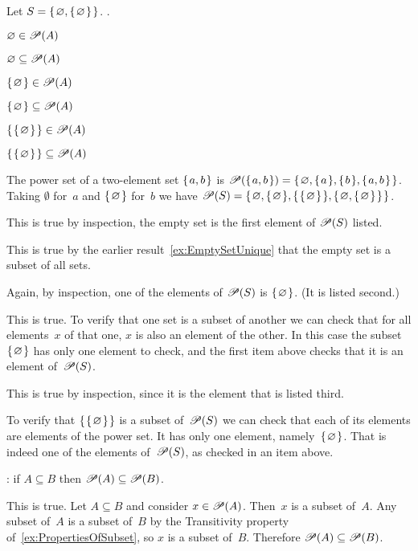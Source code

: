 \documentclass{ibl}
\begin{document}
\begin{ex}  Let $S=\mbox{$\{\hspace{0.1em}\varnothing,\mbox{$\{\hspace{0.1em}\varnothing\hspace{0.1em}\}$}\hspace{0.1em}\}$}$. \pord.
\begin{exes}
\item $\varnothing\in\mathscr{P}(A)$    
\item $\varnothing\subseteq\mathscr{P}(A)$    
\item $\mbox{$\{\hspace{0.1em}\varnothing\hspace{0.1em}\}$}\in\mathscr{P}(A)$    
\item $\mbox{$\{\hspace{0.1em}\varnothing\hspace{0.1em}\}$}\subseteq\mathscr{P}(A)$    
\item $\mbox{$\{\hspace{0.1em}\mbox{$\{\hspace{0.1em}\varnothing\hspace{0.1em}\}$}\hspace{0.1em}\}$}\in\mathscr{P}(A)$    
\item $\mbox{$\{\hspace{0.1em}\mbox{$\{\hspace{0.1em}\varnothing\hspace{0.1em}\}$}\hspace{0.1em}\}$}\subseteq\mathscr{P}(A)$    
\end{exes}
\begin{ans}
The power set of a two-element set $\mbox{$\{\hspace{0.1em}a,b\hspace{0.1em}\}$}$ is 
$\mathscr{P}(\mbox{$\{\hspace{0.1em}a,b\hspace{0.1em}\}$})=\mbox{$\{\hspace{0.1em}\varnothing,\mbox{$\{\hspace{0.1em}a\hspace{0.1em}\}$},\mbox{$\{\hspace{0.1em}b\hspace{0.1em}\}$},\mbox{$\{\hspace{0.1em}a,b\hspace{0.1em}\}$}\hspace{0.1em}\}$}$.
Taking $\emptyset$ for~$a$ and $\mbox{$\{\hspace{0.1em}\varnothing\hspace{0.1em}\}$}$ for~$b$ we have
$\mathscr{P}(S)=\mbox{$\{\hspace{0.1em}\varnothing, \mbox{$\{\hspace{0.1em}\varnothing\hspace{0.1em}\}$}, \mbox{$\{\hspace{0.1em}\mbox{$\{\hspace{0.1em}\varnothing\hspace{0.1em}\}$}\hspace{0.1em}\}$}, 
                   \mbox{$\{\hspace{0.1em}\varnothing, \mbox{$\{\hspace{0.1em}\varnothing\hspace{0.1em}\}$}\hspace{0.1em}\}$}\hspace{0.1em}\}$}$.
\begin{exes}
\item This is true by inspection, the empty set is the first element
  of $\mathscr{P}(S)$ listed.
\item This is true by the earlier result~\ref{ex:EmptySetUnique}
  that the empty set is a subset of all sets.
\item Again, by inspection, one of the elements of $\mathscr{P}(S)$ is 
  $\mbox{$\{\hspace{0.1em}\varnothing\hspace{0.1em}\}$}$.  (It is listed second.)
\item This is true.
  To verify that one set is a subset of another we can check that for all
  elements~$x$ of that one, $x$ is also an element of the other.
  In this case the subset~$\mbox{$\{\hspace{0.1em}\varnothing\hspace{0.1em}\}$}$ has only one element to check,
  and the first item above checks that it is an element of~$\mathscr{P}(S)$.
\item This is true by inspection, since it is the element that is listed
  third.
\item To verify that $\mbox{$\{\hspace{0.1em}\mbox{$\{\hspace{0.1em}\varnothing\hspace{0.1em}\}$}\hspace{0.1em}\}$}$ is a subset of~$\mathscr{P}(S)$
  we can check that each of its elements are elements of the power set.
  It has only one element, namely~$\mbox{$\{\hspace{0.1em}\varnothing\hspace{0.1em}\}$}$.
  That is indeed one of the elements of~$\mathscr{P}(S)$, as checked in 
  an item above. 
\end{exes}
\end{ans}
\end{ex}

\begin{ex} \pord:
if $A\subseteq B$ then $\mathscr{P}(A)\subseteq\mathscr{P}(B)$.  
\begin{ans}
This is true.
Let $A\subseteq B$ and consider $x\in\mathscr{P}(A)$.
Then~$x$ is a subset of~$A$.
Any subset of~$A$ is a subset of~$B$ by 
the Transitivity property of~\ref{ex:PropertiesOfSubset},
so $x$ is a subset of~$B$.
Therefore $\mathscr{P}(A)\subseteq\mathscr{P}(B)$.
\end{ans}
\end{ex}
\end{document}
